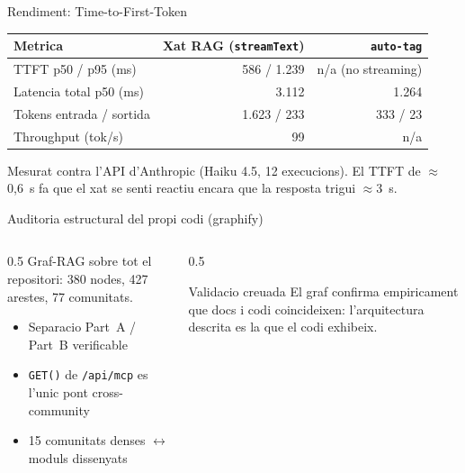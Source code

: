 \documentclass[10pt, aspectratio=169]{beamer}
\begin{document}
\begin{frame}{Rendiment: Time-to-First-Token}
  \begin{center}
    \footnotesize
    \begin{tabular}{@{}lrr@{}}
      \toprule
      Metrica & Xat RAG (\texttt{streamText}) & \texttt{auto-tag} \\
      \midrule
      TTFT p50 / p95 (ms)        & \alert{586 / 1.239} & n/a (no streaming) \\
      Latencia total p50 (ms)    & 3.112               & 1.264 \\
      Tokens entrada / sortida   & 1.623 / 233         & 333 / 23 \\
      Throughput (tok/s)         & \alert{99}          & n/a \\
      \bottomrule
    \end{tabular}
  \end{center}
  \vfill
  \begin{center}
    Mesurat contra l'API d'Anthropic (Haiku 4.5, 12 execucions). El TTFT de
    $\approx$0,6~s fa que el xat se senti reactiu encara que la resposta trigui $\approx$3~s.
  \end{center}
\end{frame}

\begin{frame}{Auditoria estructural del propi codi (graphify)}
  \begin{columns}[c]
    \begin{column}{0.5\textwidth}
      Graf-RAG sobre tot el repositori: \alert{380 nodes}, 427 arestes,
      77 comunitats.
      \medskip
      \begin{itemize}
        \item Separacio Part~A / Part~B verificable
        \item \texttt{GET()} de \texttt{/api/mcp} es l'unic pont cross-community
        \item 15 comunitats denses $\leftrightarrow$ moduls dissenyats
      \end{itemize}
    \end{column}
    \begin{column}{0.5\textwidth}
      \begin{exampleblock}{Validacio creuada}
        El graf confirma empiricament que docs i codi coincideixen: l'arquitectura
        descrita es la que el codi exhibeix.
      \end{exampleblock}
    \end{column}
  \end{columns}
\end{frame}
\end{document}
